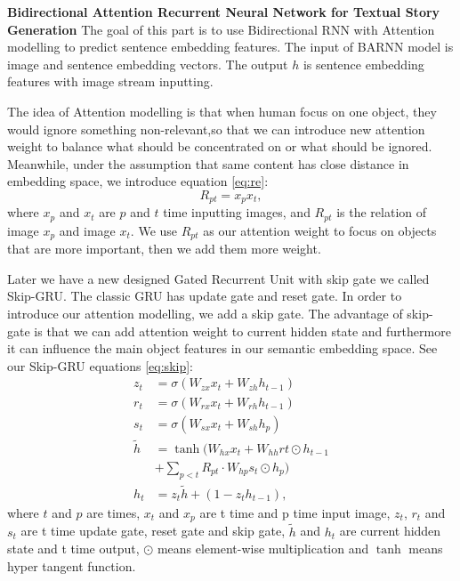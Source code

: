 \documentclass[11pt]{article}
\begin{document}
{\bf Bidirectional Attention Recurrent Neural Network for Textual Story Generation} The goal of this part is to use Bidirectional RNN with Attention modelling to predict sentence embedding features. The input of BARNN model is image and sentence embedding vectors. The output $h$ is sentence embedding features with image stream inputting. 

The idea of Attention modelling \cite{730558} is that when human focus on one object, they would ignore something non-relevant,so that we can introduce new attention weight to balance what should be concentrated on or what should be ignored. Meanwhile, under the assumption that same content has close distance in embedding space, we introduce equation \ref{eq:re}:
\begin{equation}
R_{pt} = x_{p}x_{t},
\label{eq:re}
\end{equation}    
where $x_{p}$ and $x_{t}$ are $p$ and $t$ time inputting images, and $R_{pt}$ is the relation of image $x_{p}$ and image $x_{t}$. We use $R_{pt}$ as our attention weight to focus on objects that are more important, then we add them more weight.

Later we have a new designed Gated Recurrent Unit with skip gate we called Skip-GRU. The classic GRU\cite{DBLP:journals/corr/ChungGCB14} has update gate and reset gate. In order to introduce our attention modelling, we add a skip gate. The advantage of skip-gate is that we can add attention weight to current hidden state and furthermore it can influence the main object features in our semantic embedding space. See our Skip-GRU equations \ref{eq:skip}:
\begin{equation}
\begin{aligned}
z_t &= \sigma(W_{zx}x_{t} + W_{zh}h_{t-1}) \\
r_t &= \sigma(W_{rx}x_{t} + W_{rh}h_{t-1}) \\
s_t &= \sigma(W_{sx}x_{t} + W_{sh}h_{p}) \\
\tilde{h} &= \tanh(W_{hx}x_{t} + W_{hh}r{t} \odot h_{t-1}\\
		 & + \sum_{p<t} R_{pt} \cdot W_{hp}s_{t} \odot h_{p}) \\
h_{t} &= z_{t}\tilde{h} + (1-z_{t}h_{t-1}),
\end{aligned}
\label{eq:skip}
\end{equation}  
where $t$ and $p$ are times, $x_t$ and $x_p$ are t time and p time input image, $z_t$, $r_t$ and $s_t$ are t time update gate, reset gate and skip gate, $\tilde{h}$ and $h_t$ are current hidden state and t time output, $\odot$ means element-wise multiplication and $\tanh$ means hyper tangent function.
\end{document}
